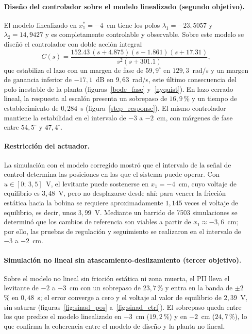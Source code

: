 \paragraph{Diseño del controlador sobre el modelo linealizado (segundo objetivo).}
El modelo linealizado en $x_1^*=-4$~cm tiene los polos $\lambda_1=-23{,}5057$ y $\lambda_2=14{,}9427$ y es completamente controlable y observable. Sobre este modelo se diseñó el controlador con doble acción integral
\[
C(s)=\frac{152.43\,(s+4.875)(s+1.861)(s+17.31)}{s^{2}(s+301.1)},
\]
que estabiliza el lazo con un margen de fase de $59{,}9^\circ$ en $129{,}3$~rad/s y un margen de ganancia inferior de $-17{,}1$~dB en $9{,}63$~rad/s, este último consecuencia del polo inestable de la planta (figuras~\ref{bode_fase} y~\ref{nyquist}). En lazo cerrado lineal, la respuesta al escalón presenta un sobrepaso de $16{,}9$\,\% y un tiempo de establecimiento de $0{,}284$~s (figura~\ref{step_response}). El mismo controlador mantiene la estabilidad en el intervalo de $-3$ a $-2$~cm, con márgenes de fase entre $54{,}5^\circ$ y $47{,}4^\circ$.

\paragraph{Restricción del actuador.}
La simulación con el modelo corregido mostró que el intervalo de la señal de control determina las posiciones en las que el sistema puede operar. Con $u\in[0;\,3{,}5]$~V, el levitante puede sostenerse en $x_1=-4$~cm, cuyo voltaje de equilibrio es $3{,}48$~V, pero no desplazarse desde ahí: para vencer la fricción estática hacia la bobina se requiere aproximadamente $1{,}145$ veces el voltaje de equilibrio, es decir, unos $3{,}99$~V. Mediante un barrido de 7503 simulaciones se determinó que los cambios de referencia son viables a partir de $x_1\approx-3{,}6$~cm; por ello, las pruebas de regulación y seguimiento se realizaron en el intervalo de $-3$ a $-2$~cm.

\paragraph{Simulación no lineal sin atascamiento-deslizamiento (tercer objetivo).}
Sobre el modelo no lineal sin fricción estática ni zona muerta, el PII lleva el levitante de $-2$ a $-3$~cm con un sobrepaso de $23{,}7$\,\% y entra en la banda de $\pm2$\,\% en $0{,}48$~s; el error converge a cero y el voltaje al valor de equilibrio de $2{,}39$~V, sin saturar (figuras~\ref{fig:sinad_pos} a~\ref{fig:sinad_ctrl}). El sobrepaso queda entre los que predice el modelo linealizado en $-3$~cm ($19{,}2$\,\%) y en $-2$~cm ($24{,}7$\,\%), lo que confirma la coherencia entre el modelo de diseño y la planta no lineal.

